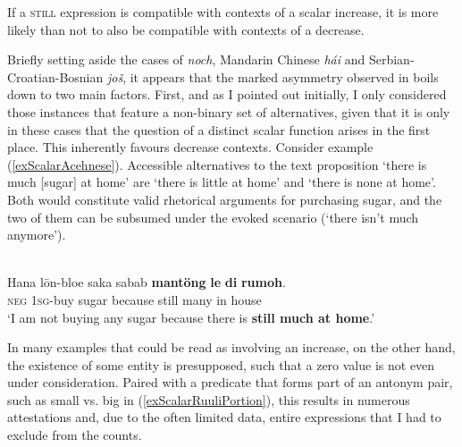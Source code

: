 \begin{exe}
	\ex If a \textsc{still} expression is compatible with contexts of a scalar increase, it is more likely than not to also be compatible with contexts of a decrease.\label{exUniversalScalar}
\end{exe}

Briefly setting aside the cases of  \textit{noch}, Mandarin Chinese \textit{hái} and Serbian\hyp Croatian\hyp Bosnian \textit{još}, it appears that the marked asymmetry observed in  boils down to two main factors. First, and as I pointed out initially, I only considered those instances that feature a non-binary set of alternatives, given that it is only in these cases that the question of a distinct scalar function arises in the first place. This inherently favours decrease contexts. Consider example (\ref{exScalarAcehnese}). Accessible alternatives to the text proposition \lq there is much [sugar] at home\rq{ }are \lq there is little at home\rq{ }and \lq there is none at home\rq{}. Both would constitute valid rhetorical arguments for purchasing sugar, and the two of them can be subsumed under the evoked  scenario (\lq there isn't much anymore\rq{}).

\begin{exe}
	\ex {}\label{exScalarAcehnese}\\
	\gll Hana lōn-bloe saka sabab \textbf{mantöng} \textbf{le} \textbf{di} \textbf{rumoh}.\\
	\textsc{neg} 1\textsc{sg}-buy sugar because still many in house\\
	\glt \lq I am not buying any sugar because there is \textbf{still much at home}.'
	\\\parencite[175]{Asyik1987}
\end{exe}

In many examples that could be read as involving an increase, on the other hand, the existence of some entity is presupposed, such that a zero value is not even under consideration. Paired with a predicate that forms part of an antonym pair, such as small vs. big in (\ref{exScalarRuuliPortion}), this results in numerous attestations and, due to the often limited data, entire expressions that I had to exclude from the counts.

